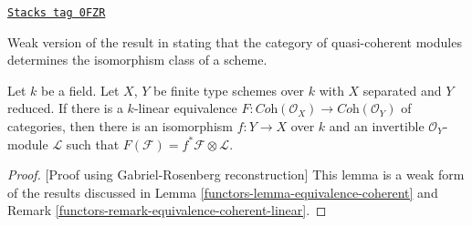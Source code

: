\begin{lemma}
\label{functors-lemma-equivalence-coherent-over-field}
\href{https://stacks.math.columbia.edu/tag/0FZR}{\texttt{Stacks tag 0FZR}}

\begin{reference}
Weak version of the result in \cite{Gabriel}
stating that the category of quasi-coherent modules
determines the isomorphism class of a scheme.
\end{reference}
Let $k$ be a field. Let $X$, $Y$ be finite type schemes over $k$ with
$X$ separated and $Y$ reduced. If there is a $k$-linear equivalence
$F : \textit{Coh}(\mathcal{O}_X) \to \textit{Coh}(\mathcal{O}_Y)$
of categories, then there is an isomorphism $f : Y \to X$
over $k$ and an invertible $\mathcal{O}_Y$-module $\mathcal{L}$
such that $F(\mathcal{F}) = f^*\mathcal{F} \otimes \mathcal{L}$.
\end{lemma}

\begin{proof}
[Proof using Gabriel-Rosenberg reconstruction]
This lemma is a weak form of the results discussed in
Lemma \ref{functors-lemma-equivalence-coherent} and
Remark \ref{functors-remark-equivalence-coherent-linear}.
\end{proof}

